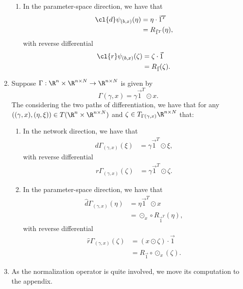 \begin{enumerate}
\begin{enumerate}
		\item In the parameter-space direction, we have that
		\begin{align*}
			\cl{d}\psi_{(b,x)}(\eta)&=\eta\cdot\vec{1}^T\\
			&=R_{\vec{1}^T}(\eta),
		\end{align*}
		with reverse differential
		\begin{align*}
			\cl{r}\psi_{(b,x)}(\zeta)&=\zeta\cdot\vec{1}\\
			&=R_{\vec{1}}(\zeta).
		\end{align*}
	\end{enumerate}
	
	\item Suppose $\Gamma:\R^n\times\R^{n\times N}\to\R^{n\times N}$ is given by
	$$\Gamma(\gamma,x)=\gamma\vec{1}^T\odot x.$$
	The considering the two paths of differentiation, we have that for any $((\gamma,x), (\eta,\xi))\in T(\R^n\times\R^{n\times N})$ and $\zeta\in T_{\Gamma(\gamma,x)}\R^{n\times N}$ that:
	\begin{enumerate}
		\item In the network direction, we have that
		\begin{align*}
			d\Gamma_{(\gamma,x)}(\xi)&=\gamma\vec{1}^T\odot\xi,
		\end{align*}
		with reverse differential
		\begin{align*}
			r\Gamma_{(\gamma,x)}(\zeta)&=\gamma\vec{1}^T\odot\zeta.
		\end{align*}
		
		\item In the parameter-space direction, we have that
		\begin{align*}
			\hat{d}\Gamma_{(\gamma,x)}(\eta)&=\eta\vec{1}^T\odot x\\
			&=\odot_x\circ R_{\vec{1}^T}(\eta),
		\end{align*}
		with reverse differential
		\begin{align*}
			\hat{r}\Gamma_{(\gamma,x)}(\zeta)&=(x\odot\zeta)\cdot\vec{1}\\
			&=R_{\vec{1}}\circ\odot_x(\zeta).
		\end{align*}
	\end{enumerate}
	
	\item As the normalization operator is quite involved, we move its computation to the appendix.
\end{enumerate}







